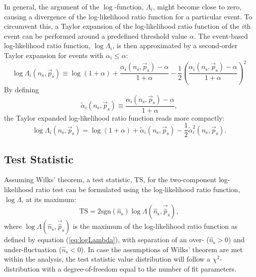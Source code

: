 \documentclass{article}
\newcommand{\ns}{n_{\mathrm{s}}}
\newcommand{\hatns}{\hat{n}_{\mathrm{s}}}
\newcommand{\ps}{\vec{p}_{\mathrm{s}}}
\newcommand{\hatps}{\vec{\hat{p}}_{\mathrm{s}}}
\begin{document}
In general, the argument of the $\log$-function, $\Lambda_i$, might become close
to zero, causing a divergence of the log-likelihood ratio function for a particular event.
To circumvent this, a Taylor expansion of the
log-likelihood ratio function of the $i$th event can be performed around a
predefined threshold value $\alpha$.
The event-based log-likelihood ratio function, $\log \Lambda_i$, is then
approximated by a second-order Taylor expansion for events with $\alpha_i \leq \alpha$:
\begin{equation}
 \log\Lambda_i(\ns,\ps) \equiv \log(1 + \alpha) + \frac{\alpha_i(\ns,\ps) - \alpha}{1 + \alpha} - \frac{1}{2} \left(\frac{\alpha_i(\ns,\ps) - \alpha}{1 + \alpha}\right)^2
 \label{eq:logLambdaiTaylor}
\end{equation}
By defining
\begin{equation}
 \tilde{\alpha}_i(\ns,\ps) \equiv \frac{\alpha_i(\ns,\ps) - \alpha}{1 + \alpha},
\end{equation}
the Taylor expanded log-likelihood ratio function reads more compactly:
\begin{equation}
 \log\Lambda_i(\ns,\ps) = \log(1 + \alpha) + \tilde{\alpha}_i(\ns,\ps) - \frac{1}{2} \tilde{\alpha}_i^2(\ns,\ps).
 \label{eq:logLambdaiTaylorOfTildeAlpha}
\end{equation}


\subsection{Test Statistic}
\label{sec:teststatistic}

Assuming Wilks' theorem, a test statistic, TS, for the two-component log-likelihood
ratio test can be formulated using the log-likelihood ratio function, $\log\Lambda$,
at its maximum:
\begin{equation}
 \mathrm{TS} = 2\mathrm{sgn}(\hatns) \log \Lambda(\hatns, \hatps),
 \label{eq:TS}
\end{equation}
where $\log \Lambda(\hatns,\hatps)$ is the maximum of the
log-likelihood ratio function as defined by equation (\ref{eq:logLambda}),
with separation of an over- ($\hatns > 0$) and under-fluctuation ($\hatns < 0$).
In case the assumptions of Wilks' theorem are met within the analysis, the test
statistic value distribution will follow a $\chi^2$-distribution with
a degree-of-freedom equal to the number of fit parameters.
\end{document}
